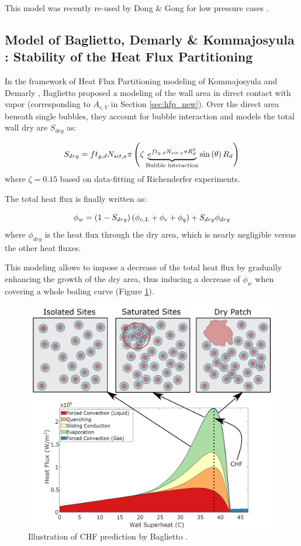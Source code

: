 This model was recently re-used by Dong \& Gong for low pressure cases \cite{dong_numerical_2022}.



\subsection{Model of Baglietto, Demarly \& Kommajosyula \cite{baglietto_boiling_2019} : Stability of the Heat Flux Partitioning}

In the framework of Heat Flux Partitioning modeling of Kommajosyula \cite{kommajosyula_development_2020} and Demarly \cite{demarly_new_2020}, Baglietto \etal \cite{baglietto_boiling_2019} proposed a modeling of the wall area in direct contact with vapor (corresponding to $A_{c,V}$ in Section \ref{sec:hfp_new}). Over the direct area beneath single bubbles, they account for bubble interaction and models the total wall dry are $S_{dry}$ as:

\begin{equation}
S_{dry} = ft_{g,d} N_{sit,a} \pi \left( \zeta \underbrace{ e^{f t_{g,d}N_{sit,a} \pi R_{d}^{2} } }_{\text{Bubble interaction}}  \mathrm{sin}\left( \theta \right) R_{d}  \right)
\end{equation} 
where $\zeta=0.15$ based on data-fitting of Richenderfer \cite{richenderfer_experimental_2018} experiments.

The total heat flux is finally written as:

\begin{equation}
\phi_{w}=\left( 1-S_{dry} \right)\left( \phi_{c,L} + \phi_{e} + \phi_{q} \right) + S_{dry} \phi_{dry}
\end{equation}
where $\phi_{dry}$ is the heat flux through the dry area, which is nearly negligible versus the other heat fluxes.

\npar

This modeling allows to impose a decrease of the total heat flux by gradually enhancing the growth of the dry area, thus inducing a decrease of $\phi_{w}$ when covering a whole boiling curve (Figure \ref{fig:chf_baglietto}).

\begin{figure}[!h]
\centering
\includegraphics[width=0.6\linewidth]{img/chf/chf_baglietto.png}
\caption{Illustration of CHF prediction by Baglietto \etal \cite{baglietto_boiling_2019}.}
\label{fig:chf_baglietto}
\end{figure}

